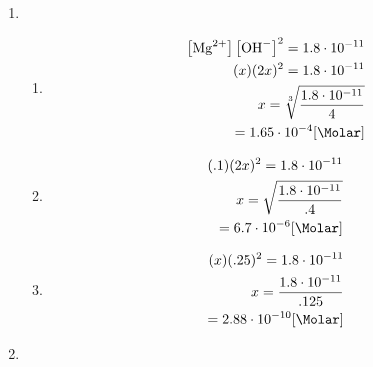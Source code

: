 \documentclass[12pt]{article}
\begin{document}
\begin{enumerate}
    \newpage

  \item {}

    \begin{enumerate}

      \item 

        \begin{equation}
          \begin{split}
            \left[ \ce{Mg^2+} \right]\left[ \ce{OH-} \right]^2=1.8\cdot10^{-11}\\
            (x)(2x)^2=1.8\cdot10^{-11}\\
            x=\sqrt[3]{\frac{1.8\cdot10^{-11}}{4}}\\
            =1.65\cdot10^{-4}[\si{\Molar}]\\
          \end{split}
          \label{4}
        \end{equation}

      \item 

        \begin{equation}
          \begin{split}
            (.1)(2x)^2=1.8\cdot10^{-11}\\
            x=\sqrt{\frac{1.8\cdot10^{-11}}{.4}}\\
            =6.7\cdot10^{-6}[\si{\Molar}]\\
          \end{split}
          \label{5}
        \end{equation}

      \item 

        \begin{equation}
          \begin{split}
            (x)(.25)^2=1.8\cdot10^{-11}\\
            x=\frac{1.8\cdot10^{-11}}{.125}\\
            =2.88\cdot10^{-10}[\si{\Molar}]
          \end{split}
          \label{6}
        \end{equation}

    \end{enumerate}

  \item

    \begin{enumerate}


\end{enumerate}
\end{enumerate}
\end{document}
